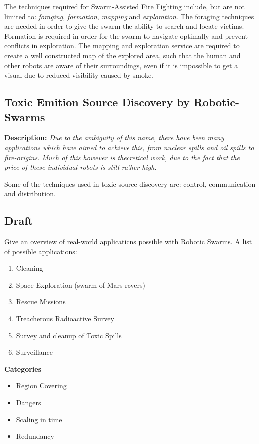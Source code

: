   The techniques required for Swarm-Assisted Fire Fighting include, but are not limited to: \emph{foraging}, \emph{formation}, \emph{mapping} and \emph{exploration}.\cite{Naghsh2008,Penders2011} The foraging techniques are needed in order to give the swarm the ability to search and locate victims. Formation is required in order for the swarm to navigate optimally and prevent conflicts in exploration. The mapping and exploration service are required to create a well constructed map of the explored area, such that the human and other robots are aware of their surroundings, even if it is impossible to get a visual due to reduced visibility caused by smoke.

  \subsection{Toxic Emition Source Discovery by Robotic-Swarms}
  \textbf{Description: }\emph{Due to the ambiguity of this name, there have been many applications which have aimed to achieve this, from nuclear spills and oil spills to fire-origins. Much of this however is theoretical work, due to the fact that the price of these individual robots is still rather high.}

  Some of the techniques used in toxic source discovery are: control, communication and distribution.\cite{Li2012}
  
  \subsection{Draft}
  Give an overview of real-world applications possible with Robotic Swarms. A list of possible applications:
    \begin{enumerate}
      \item Cleaning
      \item Space Exploration (swarm of Mars rovers)
      \item Rescue Missions
      \item Treacherous Radioactive Survey
      \item Survey and cleanup of Toxic Spills
      \item Surveillance
    \end{enumerate}
  \textbf{Categories}
    \begin{itemize}
      \item Region Covering
      \item Dangers
      \item Scaling in time
      \item Redundancy
    \end{itemize}
  